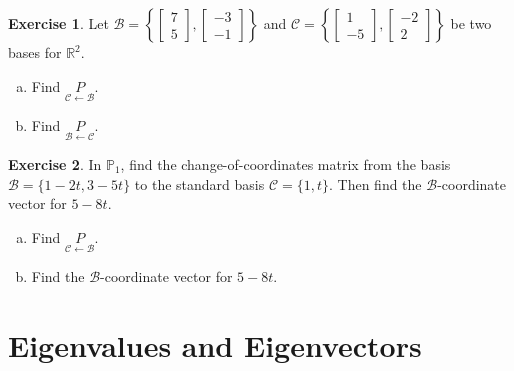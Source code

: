 \documentclass[10pt]{book}
\theoremstyle{definition}
\newtheorem{exercise}{Exercise}[section]
\newcommand{\R}{\mathbb{R}}
\newcommand{\Poly}{\mathbb{P}}
\newcommand{\B}{\mathscr{B}}
\newcommand{\C}{\mathscr{C}}
\newcommand{\CoC}[2]{\underset{#2\leftarrow #1}{P}}
\begin{document}
\begin{exercise} %
	Let $\B=\left\{ \begin{bmatrix}7\\5\end{bmatrix},\begin{bmatrix}-3\\-1\end{bmatrix} \right\}$ and $\C=\left\{ \begin{bmatrix}1\\-5\end{bmatrix},\begin{bmatrix}-2\\2\end{bmatrix} \right\}$ be two bases for $\R^2$.
	\begin{multicols}{2}
		\begin{enumerate}[(a)]
			\item Find $\CoC{\B}{\C}$.
			\item Find $\CoC{\C}{\B}$.
		\end{enumerate}
	\end{multicols}
\end{exercise}
\vfill


\begin{exercise} %
	In $\Poly_1$, find the change-of-coordinates matrix from the basis $\B=\{ 1-2t , 3-5t \}$ to the standard basis $\C=\{1,t\}$. Then find the $\B$-coordinate vector for $5-8t$.
	\begin{multicols}{2}
		\begin{enumerate}[(a)]
			\item Find $\CoC{\B}{\C}$.
			\item Find the $\B$-coordinate vector for $5-8t$.
		\end{enumerate}
	\end{multicols}
\end{exercise}
\vfill




\newpage


\chapter{Eigenvalues and Eigenvectors}
\setcounter{section}{0}
\end{document}
